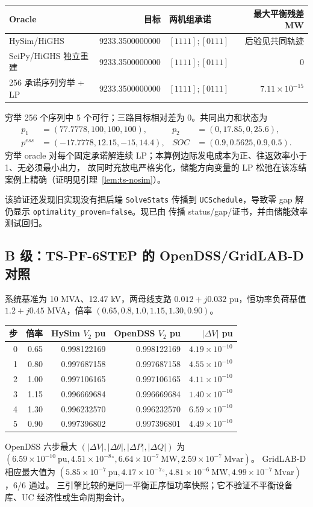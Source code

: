 \begin{center}\footnotesize
\begin{tabular}{@{}L{4.0cm}r L{5.1cm}r@{}}
\toprule Oracle & 目标 & 两机组承诺 & 最大平衡残差 MW\\\midrule
HySim/HiGHS & 9233.3500000000 & $[1111];[0111]$ & 后验见共同轨迹\\
SciPy/HiGHS 独立重建 & 9233.3500000000 & $[1111];[0111]$ & 0\\
256 承诺序列穷举 + LP & 9233.3500000000 & $[1111];[0111]$ & $7.11\times10^{-15}$\\
\bottomrule
\end{tabular}
\end{center}
穷举 256 个序列中 5 个可行；三路目标相对差为 0。共同出力和状态为
\begin{align*}
p_1&=(77.7778,100,100,100),&p_2&=(0,17.85,0,25.6),\\
p^{ess}&=(-17.7778,12.15,-15,14.4),&SOC&=(0.9,0.5625,0.9,0.5).
\end{align*}
穷举 oracle 对每个固定承诺解连续 LP；本算例边际发电成本为正、往返效率小于 1、无必须最小出力，
故同时充放电严格劣化，储能方向变量的 LP 松弛在该冻结案例上精确（证明见引理~\ref{lem:ts-nosim}）。

该验证还发现旧实现没有把后端 \texttt{SolveStats} 传播到 \texttt{UCSchedule}，导致零 gap 解仍显示
\texttt{optimality\_proven=false}。现已由
 传播 status/gap/证书，并由储能效率测试回归。

\subsection{B 级：TS-PF-6STEP 的 OpenDSS/GridLAB-D 对照}
系统基准为 10 MVA、12.47 kV，两母线支路 $0.012+j0.032$ pu，恒功率负荷基值
$1.2+j0.45$ MVA，倍率 $(0.65,0.8,1.0,1.15,1.30,0.90)$。
\begin{center}\footnotesize
\begin{tabular}{@{}r r r r r@{}}
\toprule 步 & 倍率 & HySim $V_2$ pu & OpenDSS $V_2$ pu & $|\Delta V|$ pu\\\midrule
0&0.65&0.998122169&0.998122169&$4.19\times10^{-10}$\\
1&0.80&0.997687158&0.997687158&$4.55\times10^{-10}$\\
2&1.00&0.997106165&0.997106165&$4.11\times10^{-10}$\\
3&1.15&0.996669684&0.996669684&$1.40\times10^{-10}$\\
4&1.30&0.996232570&0.996232570&$6.59\times10^{-10}$\\
5&0.90&0.997396802&0.997396801&$4.49\times10^{-10}$\\
\bottomrule
\end{tabular}
\end{center}
OpenDSS 六步最大 $(|\Delta V|,|\Delta\theta|,|\Delta P|,|\Delta Q|)$ 为
$(6.59\times10^{-10}\ \mathrm{pu},4.51\times10^{-8}\!^\circ,
6.64\times10^{-7}\ \mathrm{MW},2.59\times10^{-7}\ \mathrm{Mvar})$。
GridLAB-D 相应最大值为
$(5.85\times10^{-7}\ \mathrm{pu},4.17\times10^{-7}\!^\circ,
4.81\times10^{-6}\ \mathrm{MW},4.99\times10^{-7}\ \mathrm{Mvar})$，6/6 通过。
三引擎比较的是同一平衡正序恒功率快照；它不验证不平衡设备库、UC 经济性或生命周期会计。

